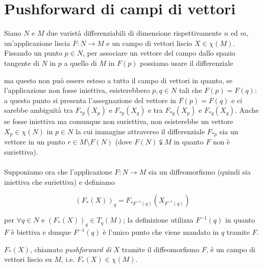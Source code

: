 \section{Pushforward di campi di vettori}

Siano $ N $ e $ M $ due varietà differenziabili di dimensione rispettivamente $ n $ ed $ m $, un'applicazione liscia $ F : N \to M $ e un campo di vettori liscio $ X \in \chi(M) $. Fissando un punto $ p \in N $, per associare un vettore del campo dallo spazio tangente di $ N $ in $ p $ a quello di $ M $ in $ F(p) $ possiamo usare il differenziale


ma questo non può essere esteso a tutto il campo di vettori in quanto, se l'applicazione non fosse iniettiva, esisterebbero $ p,q \in N $ tali che $ F(p) = F(q) $: a questo punto si presenta l'assegnazione del vettore in $ F(p) = F(q) $ e ci sarebbe ambiguità tra $ F_{*p}(X_{p}) $ e $ F_{*p}(X_{q}) $ e tra $ F_{*q}(X_{p}) $ e $ F_{*q}(X_{q}) $. Anche se fosse iniettiva ma comunque non suriettiva, non esisterebbe un vettore $ X_{p} \in \chi(N) $ in $ p \in N $ la cui immagine attraverso il differenziale $ F_{*p} $ sia un vettore in un punto $ r \in M \setminus F(N) $ (dove $ F(N) \subsetneqq M $ in quanto $ F $ non è suriettiva).\\\\
%
Supponiamo ora che l'applicazione $ F : N \to M $ sia un diffeomorfismo (quindi sia iniettiva che suriettiva) e definiamo

\begin{equation}
	(F_{*} (X))_{q} = F_{*F^{-1}(q)} (X_{F^{-1}(q)})
\end{equation}

per $ \forall q \in N $ e $ (F_{*} (X))_{q} \in T_{q}(M) $; la definizione utilizza $ F^{-1}(q) $ in quanto $ F $ è biettiva e dunque $ F^{-1}(q) $ è l'unico punto che viene mandato in $ q $ tramite $ F $.

\begin{definition}
	$ F_{*}(X) $, chiamato \textit{pushforward di} $ X $ tramite il diffeomorfismo $ F $, è un campo di vettori liscio su $ M $, i.e. $ F_{*}(X) \in \chi(M) $.
\end{definition}

